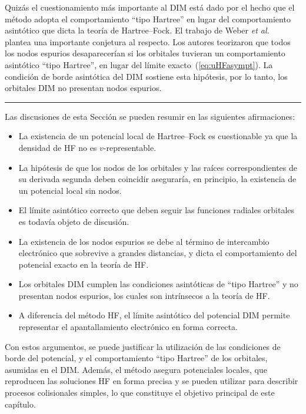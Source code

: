 Quizás el cuestionamiento más importante al DIM está dado por el hecho 
que el método adopta el comportamiento ``tipo Hartree'' en lugar del 
comportamiento asintótico que dicta la teoría de Hartree--Fock. El 
trabajo de Weber \textit{et al.}~\cite{Weber:70} plantea una importante 
conjetura al respecto. Los autores teorizaron que todos los nodos 
espurios desaparecerían si los orbitales tuvieran un 
comportamiento asintótico ``tipo Hartree'', en lugar del límite 
exacto~(\ref{eq:uHFasympt}). La condición de borde asintótica del DIM 
sostiene esta hipótesis, por lo tanto, los orbitales DIM no presentan 
nodos espurios.

\begin{center}
\rule[0.5ex]{0.8\linewidth}{0.5pt}
\end{center}

Las discusiones de esta Sección se pueden resumir en las siguientes 
afirmaciones:
\begin{itemize}
\item La existencia de un potencial local de Hartree--Fock es 
cuestionable ya que la densidad de HF no es $v$-representable.
\item La hipótesis de que los nodos de los orbitales y las raíces 
correspondientes de su derivada segunda deben coincidir aseguraría, en 
principio, la existencia de un potencial local sin nodos.
\item El límite asintótico correcto que deben seguir las funciones 
radiales orbitales es todavía objeto de discusión. 
\item La existencia de los nodos espurios se debe al término de 
intercambio electrónico que sobrevive a grandes distancias, y dicta el 
comportamiento del potencial exacto en la teoría de HF.
\item Los orbitales DIM cumplen las condiciones asintóticas de ``tipo 
Hartree'' y no presentan nodos espurios, los cuales son intrínsecos a la 
teoría de HF.
\item A diferencia del método HF, el límite asintótico del potencial DIM 
permite representar el apantallamiento electrónico en forma correcta.
\end{itemize}
Con estos argumentos, se puede justificar la utilización de las 
condiciones de borde del potencial, y el comportamiento ``tipo Hartree'' 
de los orbitales, asumidas en el DIM. Además, el método asegura 
potenciales locales, que reproducen las soluciones HF en forma precisa
y se pueden utilizar para describir procesos colisionales simples, lo 
que constituye el objetivo principal de este capítulo.

